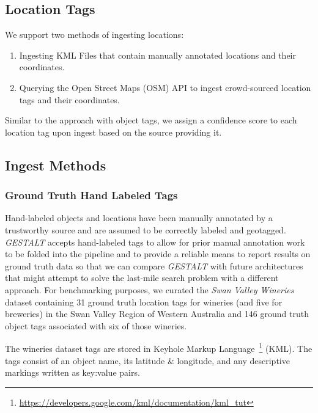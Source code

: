 \subsection{Location Tags}
We support two methods of ingesting locations:
\begin{enumerate}
    \item Ingesting KML Files that contain manually annotated locations and their coordinates.
    \item Querying the Open Street Maps (OSM) API to ingest crowd-sourced location tags and their coordinates. 
\end{enumerate}

Similar to the approach with object tags, we assign a confidence score to each location tag upon ingest based on the source providing it.

\subsection{Ingest Methods}
\subsubsection{Ground Truth Hand Labeled Tags} 
Hand-labeled objects and locations have been manually annotated by a trustworthy source and are assumed to be correctly labeled and geotagged. 
\emph{GESTALT} accepts hand-labeled tags to allow for prior manual annotation work to be folded into the pipeline and to provide a reliable means to report results on ground truth data so that we can compare \emph{GESTALT} with future architectures that might attempt to solve the last-mile search problem with a different approach. 
For benchmarking purposes, we curated the \emph{Swan Valley Wineries} dataset containing 31 ground truth location tags for wineries (and five for breweries) in the Swan Valley Region of Western Australia and 146 ground truth object tags associated with six of those wineries. 

The wineries dataset tags are stored in Keyhole Markup Language~\footnote{\href{https://developers.google.com/kml/documentation/kml\_tut}{https://developers.google.com/kml/documentation/kml\_tut}} (KML).
The tags consist of an object name, its latitude \& longitude, and any descriptive markings written as key:value pairs. 

